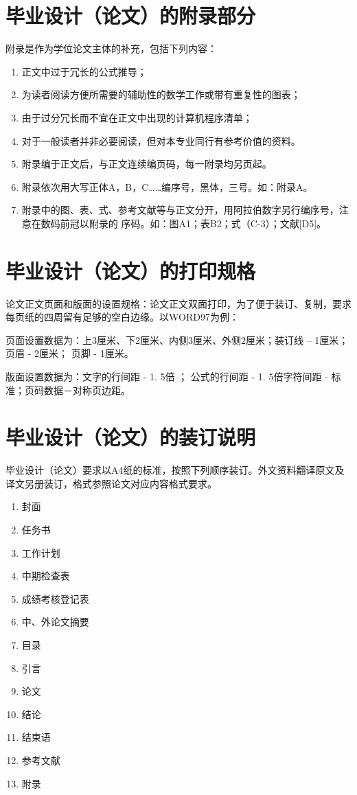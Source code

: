 \section{毕业设计（论文）的附录部分}
附录是作为学位论文主体的补充，包括下列内容：
\begin{enumerate}
  \item 正文中过于冗长的公式推导；
  \item 为读者阅读方便所需要的辅助性的数学工作或带有重复性的图表；
  \item 由于过分冗长而不宜在正文中出现的计算机程序清单；
  \item 对于一般读者并非必要阅读，但对本专业同行有参考价值的资料。
  \item 附录编于正文后，与正文连续编页码，每一附录均另页起。
  \item 附录依次用大写正体A，B，C……编序号，黑体，三号。如：附录A。
  \item 附录中的图、表、式、参考文献等与正文分开，用阿拉伯数字另行编序号，注意在数码前冠以附录的
      序码。如：图A1；表B2；式（C-3）；文献[D5]。
\end{enumerate}
\section{毕业设计（论文）的打印规格}
论文正文页面和版面的设置规格：论文正文双面打印，为了便于装订、复制，要求每页纸的四周留有足够的空白边缘。以WORD97为例：

页面设置数据为：上3厘米、下2厘米、内侧3厘米、外侧2厘米；装订线 -- 1厘米；页眉  - 2厘米；  页脚 - 1厘米。

版面设置数据为：文字的行间距 - 1. 5倍 ；  公式的行间距 - 1. 5倍字符间距 - 标准；页码数据－对称页边距。

\section{毕业设计（论文）的装订说明}
毕业设计（论文）要求以A4纸的标准，按照下列顺序装订。外文资料翻译原文及译文另册装订，格式参照论文对应内容格式要求。

\begin{enumerate}
  \item 封面
  \item 任务书
  \item 工作计划
  \item 中期检查表
  \item 成绩考核登记表
  \item 中、外论文摘要
  \item 目录
  \item 引言
  \item 论文
  \item 结论
  \item 结束语
  \item 参考文献
  \item 附录
\end{enumerate}










